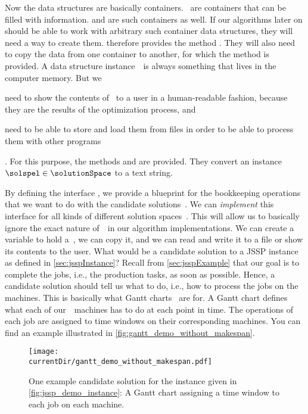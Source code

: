 Now the data structures are basically containers.
\numpyndarrays\ are containers that can be filled with information.
 and  are such containers as well.
If our algorithms later on should be able to work with arbitrary such container data structures, they will need a way to create them.
 therefore provides the method .
They will also need to copy the data from one container to another, for which the  method is provided.
A data structure instance~\solspel\ is always something that lives in the computer memory.
But we \begin{enumerate*}[label=\emph{\alph*})]%
\item need to show the contents of \solspel\ to a user in a human-readable fashion, because they are the results of the optimization process, and%
\item need to be able to store and load them from files in order to be able to process them with other programs%
\end{enumerate*}.
For this purpose, the methods  and  are provided.
They convert an instance $\solspel\in\solutionSpace$ to a text string.

By defining the interface , we provide a blueprint for the bookkeeping operations that we want to do with the candidate solutions~\solspel.
We can \emph{implement} this interface for all kinds of different solution spaces~\solutionSpace.
This will allow us to basically ignore the exact nature of~\solutionSpace\ in our algorithm implementations.
We can create a variable to hold a~\solspel, we can copy it, and we can read and write it to a file or show its contents to the user.
%
\endhsection%
%
%
%
What would be a candidate solution to a \gls{JSSP} instance as defined in \autoref{sec:jsspInstance}?
Recall from \autoref{sec:jsspExample} that our goal is to complete the jobs, i.e., the production tasks, as soon as possible.
Hence, a candidate solution should tell us what to do, i.e., how to process the jobs on the machines.%
%
%
\label{sec:jssp:gantt}%
%
This is basically what Gantt charts~\cite{W2003GCACA,K2000SORCP} are for.
A Gantt chart defines what each of our~\jsspMachines\ machines has to do at each point in time.
The operations of each job are assigned to time windows on their corresponding machines.
You can find an example illustrated in \autoref{fig:gantt_demo_without_makespan}.

\begin{figure}%
\centering%
\texttt{[image: \\currentDir/gantt\_demo\_without\_makespan.pdf]}%
\caption{One example candidate solution for the  instance given in \autoref{fig:jssp_demo_instance}: A Gantt chart assigning a time window to each job on each machine.}%
\label{fig:gantt_demo_without_makespan}%
\end{figure}

